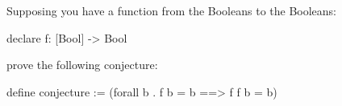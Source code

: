 %
%
Supposing you have a function from the Booleans to the Booleans:
\begin{tcAthena}
declare f: [Bool] -> Bool
\end{tcAthena}
prove the following conjecture:
\begin{tcAthena}
define conjecture := (forall b . f b = b ==> f f b = b)
\end{tcAthena}
